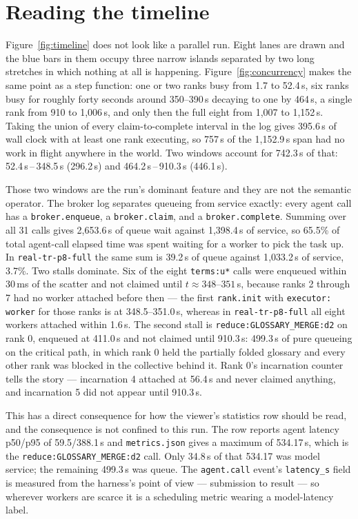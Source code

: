 \documentclass[11pt]{article}
\begin{document}


\section{Reading the timeline}

Figure~\ref{fig:timeline} does not look like a parallel run. Eight lanes are drawn and the
blue bars in them occupy three narrow islands separated by two long stretches in which nothing
at all is happening. Figure~\ref{fig:concurrency} makes the same point as a step function: one
or two ranks busy from 1.7 to 52.4\,s, six ranks busy for roughly forty seconds around 350--390\,s
decaying to one by 464\,s, a single rank from 910 to 1{,}006\,s, and only then the full eight
from 1{,}007 to 1{,}152\,s. Taking the union of every claim-to-complete interval in the log
gives 395.6\,s of wall clock with at least one rank executing, so 757\,s of the 1{,}152.9\,s
span had no work in flight anywhere in the world. Two windows account for 742.3\,s of that:
52.4\,s\,--\,348.5\,s (296.2\,s) and 464.2\,s\,--\,910.3\,s (446.1\,s).

Those two windows are the run's dominant feature and they are not the semantic operator. The
broker log separates queueing from service exactly: every agent call has a
\texttt{broker.enqueue}, a \texttt{broker.claim}, and a \texttt{broker.complete}. Summing over
all 31 calls gives 2{,}653.6\,s of queue wait against 1{,}398.4\,s of service, so 65.5\% of
total agent-call elapsed time was spent waiting for a worker to pick the task up. In
\texttt{real-tr-p8-full} the same sum is 39.2\,s of queue against 1{,}033.2\,s of service, 3.7\%.
Two stalls dominate. Six of the eight \texttt{terms:u*} calls were enqueued within 30\,ms of the
scatter and not claimed until $t\approx348$--$351$\,s, because ranks 2 through 7 had no worker attached
before then --- the first \texttt{rank.init} with \texttt{executor: worker} for those ranks is at
348.5--351.0\,s, whereas in \texttt{real-tr-p8-full} all eight workers attached within 1.6\,s.
The second stall is \texttt{reduce:GLOSSARY\_MERGE:d2} on rank 0, enqueued at 411.0\,s and not
claimed until 910.3\,s: 499.3\,s of pure queueing on the critical path, in which rank 0 held the
partially folded glossary and every other rank was blocked in the collective behind it. Rank 0's
incarnation counter tells the story --- incarnation 4 attached at 56.4\,s and never claimed
anything, and incarnation 5 did not appear until 910.3\,s.

This has a direct consequence for how the viewer's statistics row should be read, and the
consequence is not confined to this run. The row reports agent latency p50/p95 of 59.5/388.1\,s
and \texttt{metrics.json} gives a maximum of 534.17\,s, which is the
\texttt{reduce:GLOSSARY\_MERGE:d2} call. Only 34.8\,s of that 534.17 was model service; the
remaining 499.3\,s was queue. The \texttt{agent.call} event's \texttt{latency\_s} field is
measured from the harness's point of view --- submission to result --- so wherever workers are
scarce it is a scheduling metric wearing a model-latency label.
\end{document}
